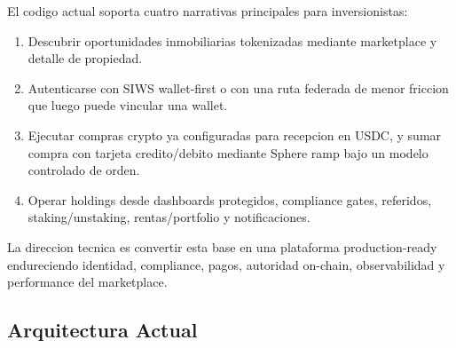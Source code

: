\documentclass[
  10pt,
  letterpaper,
]{article}
\providecommand{\tightlist}{%
  \setlength{\itemsep}{0pt}\setlength{\parskip}{0pt}}
\begin{document}
El codigo actual soporta cuatro narrativas principales para
inversionistas:

\begin{enumerate}
\def\labelenumi{\arabic{enumi}.}
\tightlist
\item
  Descubrir oportunidades inmobiliarias tokenizadas mediante marketplace
  y detalle de propiedad.
\item
  Autenticarse con SIWS wallet-first o con una ruta federada de menor
  friccion que luego puede vincular una wallet.
\item
  Ejecutar compras crypto ya configuradas para recepcion en USDC, y
  sumar compra con tarjeta credito/debito mediante Sphere ramp bajo un
  modelo controlado de orden.
\item
  Operar holdings desde dashboards protegidos, compliance gates,
  referidos, staking/unstaking, rentas/portfolio y notificaciones.
\end{enumerate}

La direccion tecnica es convertir esta base en una plataforma
production-ready endureciendo identidad, compliance, pagos, autoridad
on-chain, observabilidad y performance del marketplace.

\subsection{Arquitectura Actual}\label{arquitectura-actual}
\end{document}
